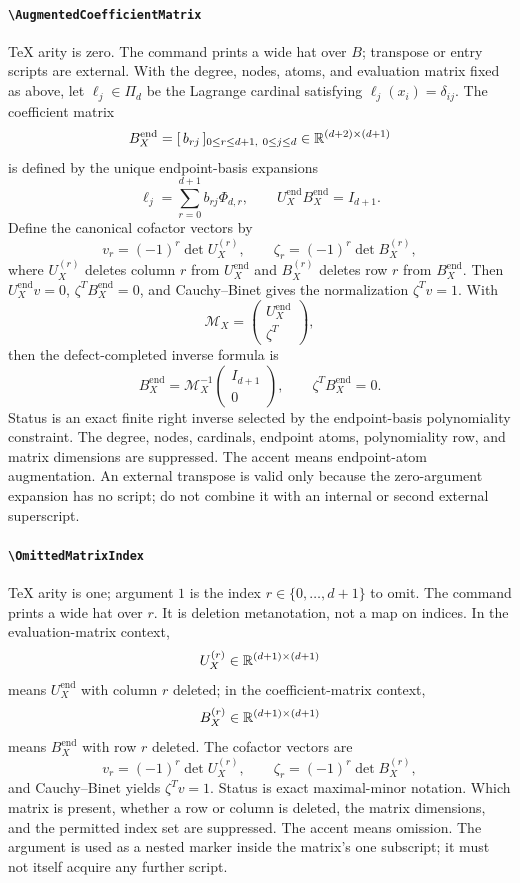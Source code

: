 \documentclass[11pt,oneside]{article}
\theoremstyle{definition}
\theoremstyle{remark}
\DeclareRobustCommand{\commandname}[1]{\texttt{\textbackslash#1}}
\DeclareRobustCommand{\localaccentname}[1]{\commandname{#1}}
\begin{document}
\paragraph{\localaccentname{AugmentedCoefficientMatrix}}
TeX arity is zero.  The command prints a wide hat over \(B\); transpose or
entry scripts are external.  With the degree, nodes, atoms, and evaluation
matrix fixed as above, let \(\ell_j\in\Pi_d\) be the Lagrange cardinal
satisfying \(\ell_j(x_i)=\delta_{ij}\).  The coefficient matrix
\[
 B_X^{\mathrm{end}}
 =
 [\,b_{rj}\,]_{
 0\le r\le d+1,\ 0\le j\le d}
 \in\mathbb{R}^{(d+2)\times(d+1)}
\]
is defined by the unique endpoint-basis expansions
\[
 \ell_j=\sum_{r=0}^{d+1}b_{rj}\Phi_{d,r},
 \qquad
 U_X^{\mathrm{end}}B_X^{\mathrm{end}}=I_{d+1}.
\]
Define the canonical cofactor vectors by
\[
 v_r=(-1)^r\det U_X^{(r)},\qquad
 \zeta_r=(-1)^r\det B_X^{(r)},
\]
where \(U_X^{(r)}\) deletes column \(r\) from \(U_X^{\mathrm{end}}\) and
\(B_X^{(r)}\) deletes row \(r\) from \(B_X^{\mathrm{end}}\).  Then
\(U_X^{\mathrm{end}}v=0\), \(\zeta^TB_X^{\mathrm{end}}=0\), and Cauchy--Binet
gives the normalization \(\zeta^Tv=1\).
With
\[
 \mathcal M_X=
 \begin{pmatrix}U_X^{\mathrm{end}}\\ \zeta^T\end{pmatrix},
\]
then the defect-completed inverse formula is
\[
 B_X^{\mathrm{end}}
 =
 \mathcal M_X^{-1}
 \begin{pmatrix}I_{d+1}\\0\end{pmatrix},
 \qquad
 \zeta^TB_X^{\mathrm{end}}=0.
\]
Status is an exact finite right inverse selected by the endpoint-basis
polynomiality constraint.  The degree, nodes, cardinals, endpoint atoms,
polynomiality row, and matrix dimensions are suppressed.  The accent means
endpoint-atom augmentation.  An external transpose is valid only because the
zero-argument expansion has no script; do not combine it with an internal or
second external superscript.

\paragraph{\localaccentname{OmittedMatrixIndex}}
TeX arity is one; argument \(1\) is the index
\(r\in\{0,\ldots,d+1\}\) to omit.  The command prints a wide hat over \(r\).
It is deletion metanotation, not a map on indices.  In the evaluation-matrix
context,
\[
 U_X^{(r)}
 \in\mathbb{R}^{(d+1)\times(d+1)}
\]
means \(U_X^{\mathrm{end}}\) with column \(r\) deleted; in the coefficient-matrix
context,
\[
 B_X^{(r)}
 \in\mathbb{R}^{(d+1)\times(d+1)}
\]
means \(B_X^{\mathrm{end}}\) with row \(r\) deleted.  The cofactor vectors are
\[
 v_r=(-1)^r\det U_X^{(r)},\qquad
 \zeta_r=(-1)^r\det B_X^{(r)},
\]
and Cauchy--Binet yields \(\zeta^Tv=1\).
Status is exact maximal-minor notation.  Which matrix is present, whether a
row or column is deleted, the matrix dimensions, and the permitted index set
are suppressed.  The accent means omission.  The argument is used as a nested
marker inside the matrix's one subscript; it must not itself acquire any
further script.
\end{document}
